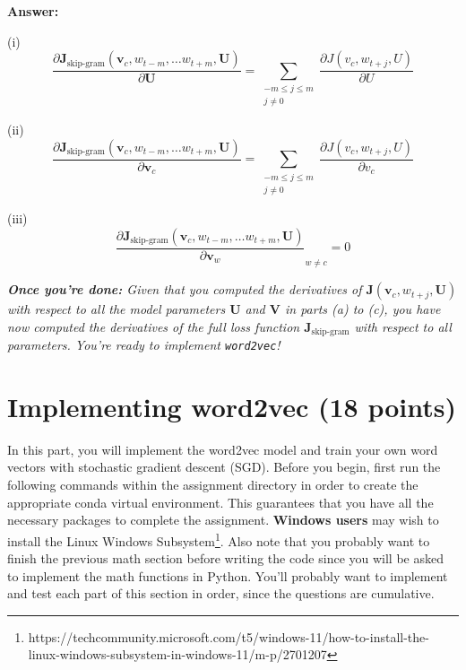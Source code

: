 \documentclass{article}
\newenvironment{answer}{
    {\bf Answer:} \sf \begingroup\color{red}
}{\endgroup}%
\begin{document}
\begin{enumerate}[label=(\alph*)]
\begin{shaded}
\begin{answer}
(i) 
\begin{equation}
	\frac{\partial \bm J_{\textrm{skip-gram}}(\bm v_c, w_{t-m},\ldots w_{t+m}, \bm U)} {\partial \bm U} = \sum_{\substack{-m\leq j\leq m \\ j\neq 0}}\frac{\partial J(v_c,w_{t+j},U)}{\partial U}
\end{equation}

(ii)
\begin{equation}
	\frac{\partial \bm J_{\textrm{skip-gram}}(\bm v_c, w_{t-m},\ldots w_{t+m}, \bm U)} {\partial \bm v_c} = \sum_{\substack{-m\leq j\leq m \\ j\neq 0}}\frac{\partial J(v_c,w_{t+j},U)}{\partial v_c}
\end{equation}

(iii) 
\begin{equation}
	\frac{\partial \bm J_{\textrm{skip-gram}}(\bm v_c, w_{t-m},\ldots w_{t+m}, \bm U)} {\partial \bm v_w}_{w\neq c} = 0
\end{equation}
\end{answer}
\end{shaded}

\textit{\textbf{Once you're done:} Given that you computed the derivatives of $\bm J(\bm v_c, w_{t+j}, \bm U)$ with respect to all the model parameters $\bm U$ and $\bm V$ in parts (a) to (c), you have now computed the derivatives of the full loss function $\bm J_{\text{skip-gram}}$ with respect to all parameters. You're ready to implement \texttt{word2vec}!} %

\end{enumerate}

\section{Implementing word2vec (18 points)}
In this part, you will implement the word2vec model and train your own word vectors with stochastic gradient descent (SGD). Before you begin, first run the following commands within the assignment directory in order to create the appropriate conda virtual environment. This guarantees that you have all the necessary packages to complete the assignment. \textbf{Windows users} may wish to install the Linux Windows Subsystem\footnote{https://techcommunity.microsoft.com/t5/windows-11/how-to-install-the-linux-windows-subsystem-in-windows-11/m-p/2701207}. Also note that you probably want to finish the previous math section before writing the code since you will be asked to implement the math functions in Python. You’ll probably want to implement and test each part of this section in order, since the questions are cumulative.
\end{document}

